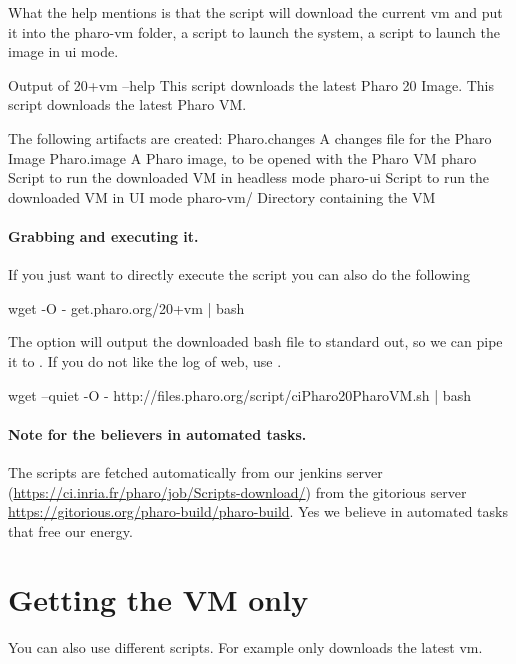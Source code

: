 \documentclass[a4paper,10pt,twoside]{book}
\begin{document}
What the help mentions is that the script will download the current vm and put it into the pharo-vm folder,  a script to launch the system,  a script to launch the image in ui mode.

\begin{code}{Output of 20+vm --help }
This script downloads the latest Pharo 20 Image.
This script downloads the latest Pharo VM.

The following artifacts are created:
    Pharo.changes  A changes file for the Pharo Image
    Pharo.image    A Pharo image, to be opened with the Pharo VM
    pharo          Script to run the downloaded VM in headless mode
    pharo-ui       Script to run the downloaded VM in UI mode
    pharo-vm/      Directory containing the VM
\end{code}



\paragraph{Grabbing and executing it.}
If you just want to directly execute the script you can also do the following

\begin{code}{}
wget -O - get.pharo.org/20+vm | bash
\end{code}

The option  will output the downloaded bash file to standard out, so we can pipe it to .
If you do not like the log of web, use .

\begin{code}{}
wget --quiet -O - http://files.pharo.org/script/ciPharo20PharoVM.sh | bash
\end{code}

\paragraph{Note for the believers in automated tasks.} 
The scripts are fetched automatically from our jenkins server (\url{https://ci.inria.fr/pharo/job/Scripts-download/}) from the gitorious server \url{https://gitorious.org/pharo-build/pharo-build}.
Yes we believe in automated tasks that free our energy. 



\section{Getting the VM only}
You can also use different scripts. For example  only downloads the latest vm.
\end{document}
